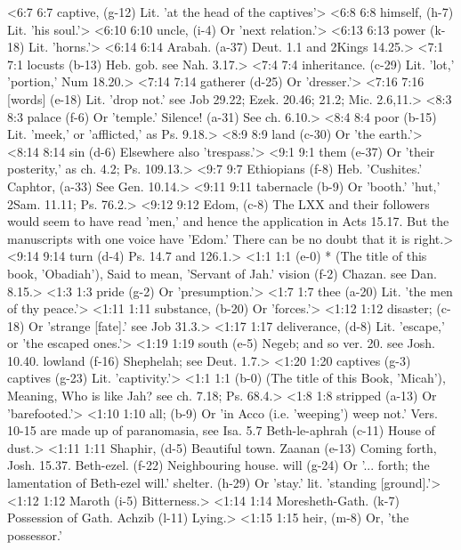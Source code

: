 <6:7 6:7  captive, (g-12)  Lit. 'at the head of the captives'>
<6:8 6:8  himself, (h-7)  Lit. 'his soul.'>
<6:10 6:10  uncle, (i-4)  Or 'next relation.'>
<6:13 6:13  power (k-18)  Lit. 'horns.'>
<6:14 6:14  Arabah. (a-37)  Deut. 1.1 and 2Kings 14.25.>
<7:1 7:1  locusts (b-13)  Heb. gob. see Nah. 3.17.>
<7:4 7:4  inheritance. (c-29)  Lit. 'lot,' 'portion,' Num 18.20.>
<7:14 7:14  gatherer (d-25)  Or 'dresser.'>
<7:16 7:16  [words] (e-18)  Lit. 'drop not.' see Job 29.22; Ezek. 20.46; 21.2; Mic. 2.6,11.>
<8:3 8:3  palace (f-6)  Or 'temple.'  Silence! (a-31)  See ch. 6.10.>
<8:4 8:4  poor (b-15)  Lit. 'meek,' or 'afflicted,' as Ps. 9.18.>
<8:9 8:9  land (c-30)  Or 'the earth.'>
<8:14 8:14  sin (d-6)  Elsewhere also 'trespass.'>
<9:1 9:1  them (e-37)  Or 'their posterity,' as ch. 4.2; Ps. 109.13.>
<9:7 9:7  Ethiopians (f-8)  Heb. 'Cushites.'
  Caphtor, (a-33)  See Gen. 10.14.>
<9:11 9:11  tabernacle (b-9)  Or 'booth.' 'hut,' 2Sam. 11.11; Ps. 76.2.>
<9:12 9:12  Edom, (c-8)  The LXX and their followers would seem to have read 'men,'  and hence the application in Acts 15.17. But the manuscripts  with one voice have 'Edom.' There can be no doubt that it is  right.>
<9:14 9:14  turn (d-4)  Ps. 14.7 and 126.1.>
<1:1 1:1   (e-0)  * (The title of this book, 'Obadiah'), Said to mean, 'Servant  of Jah.'  vision (f-2)  Chazan. see Dan. 8.15.>
<1:3 1:3  pride (g-2)  Or 'presumption.'>
<1:7 1:7  thee (a-20)  Lit. 'the men of thy peace.'>
<1:11 1:11  substance, (b-20)  Or 'forces.'>
<1:12 1:12  disaster; (c-18)  Or 'strange [fate].' see Job 31.3.>
<1:17 1:17  deliverance, (d-8)  Lit. 'escape,' or 'the escaped ones.'>
<1:19 1:19  south (e-5)  Negeb; and so ver. 20. see Josh. 10.40.
  lowland (f-16)  Shephelah; see Deut. 1.7.>
<1:20 1:20  captives (g-3)  captives (g-23)
  Lit. 'captivity.'>
<1:1 1:1   (b-0)  (The title of this Book, 'Micah'), Meaning, Who is like Jah?  see ch. 7.18; Ps. 68.4.>
<1:8 1:8  stripped (a-13)  Or 'barefooted.'>
<1:10 1:10  all; (b-9)  Or 'in Acco (i.e. 'weeping') weep not.' Vers. 10-15 are made  up of paranomasia, see Isa. 5.7
  Beth-le-aphrah (c-11)  House of dust.>
<1:11 1:11  Shaphir, (d-5)  Beautiful town.
  Zaanan (e-13)  Coming forth, Josh. 15.37.
  Beth-ezel. (f-22)  Neighbouring house.
  will (g-24)  Or '... forth; the lamentation of Beth-ezel will.'
  shelter. (h-29)  Or 'stay.' lit. 'standing [ground].'>
<1:12 1:12  Maroth (i-5)  Bitterness.>
<1:14 1:14  Moresheth-Gath. (k-7)  Possession of Gath.
  Achzib (l-11)  Lying.>
<1:15 1:15  heir, (m-8)  Or, 'the possessor.'
